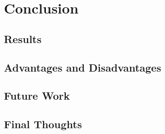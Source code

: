 \chapter{Conclusion}

\section{Results}

\section{Advantages and Disadvantages}

\section{Future Work}

\section{Final Thoughts}
